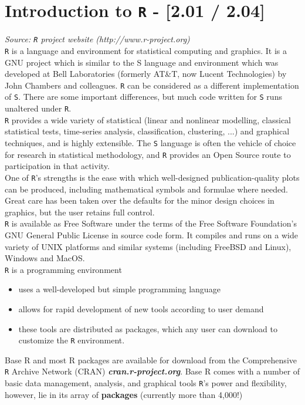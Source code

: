 \documentclass[a4paper,12pt]{article}
\begin{document}

\section*{Introduction to \texttt{R} - [2.01 / 2.04]}
\emph{Source: \texttt{R} project website (http://www.r-project.org)}\\

\noindent \texttt{R} is a language and environment for statistical computing and graphics. It is a GNU project which is similar to the S language and environment which was developed at Bell Laboratories (formerly AT\&T, now Lucent Technologies) by John Chambers and colleagues. \texttt{R} can be considered as a different implementation of \texttt{S}. There are some important differences, but much code written for \texttt{S} runs unaltered under \texttt{R}.\\

\noindent \texttt{R} provides a wide variety of statistical (linear and nonlinear modelling, classical statistical tests, time-series analysis, classification, clustering, ...) and graphical techniques, and is highly extensible. The \texttt{S} language is often the vehicle of choice for research in statistical methodology, and \texttt{R} provides an Open Source route to participation in that activity.\\

\noindent One of \texttt{R}'s strengths is the ease with which well-designed publication-quality plots can be produced, including mathematical symbols and formulae where needed. Great care has been taken over the defaults for the minor design choices in graphics, but the user retains full control.\\

\noindent \texttt{R} is available as Free Software under the terms of the Free Software Foundation's GNU General Public License in source code form. It compiles and runs on a wide variety of UNIX platforms and similar systems (including FreeBSD and Linux), Windows and MacOS.\\


\texttt{R} is a programming environment
\begin{itemize}
\item uses a well-developed but simple programming language
\item allows for rapid development of new tools according to user demand
\item these tools are distributed as packages, which any user can download to customize the \texttt{R} environment.
\end{itemize}
Base R and most R packages are available for download from the Comprehensive \texttt{R} Archive Network (CRAN)
\textbf{\textit{cran.r-project.org}}. Base R comes with a number of basic data management, analysis, and graphical tools
\texttt{R}'s power and flexibility, however, lie in its array of \textbf{packages} (currently more than 4,000!)
\end{document}
